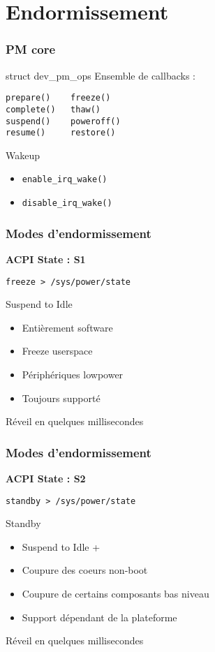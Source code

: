 \section{Endormissement}

\begin{frame}[fragile]
	\frametitle{PM core}
	\begin{block}{struct dev\_pm\_ops}
Ensemble de callbacks : 

\begin{verbatim}
prepare()    freeze()
complete()   thaw()
suspend()    poweroff()
resume()     restore()
\end{verbatim}
	\end{block}
	\begin{block}{Wakeup}
		\begin{itemize}
			\item \texttt{enable\_irq\_wake()}
			\item \texttt{disable\_irq\_wake()}
		\end{itemize}
	\end{block}
\end{frame}
\begin{frame}
	\frametitle{Modes d'endormissement}
	\textbf{ACPI State : S1}

	\texttt{freeze > /sys/power/state}
	\begin{block}{Suspend to Idle}
		\begin{itemize}
			\item Entièrement software
			\item Freeze userspace
			\item Périphériques lowpower
			\item Toujours supporté
		\end{itemize}
	\end{block}
	Réveil en quelques millisecondes
\end{frame}
\begin{frame}
	\frametitle{Modes d'endormissement}
	\textbf{ACPI State : S2}

	\texttt{standby > /sys/power/state}
	\begin{block}{Standby}
		\begin{itemize}
			\item Suspend to Idle +
			\item Coupure des coeurs non-boot
			\item Coupure de certains composants bas niveau
			\item Support dépendant de la plateforme
		\end{itemize}
	\end{block}
	Réveil en quelques millisecondes
\end{frame}

